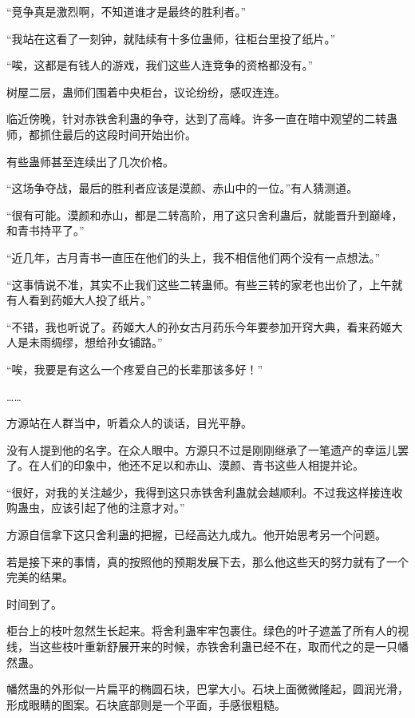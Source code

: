 
\begin{this_body}

“竞争真是激烈啊，不知道谁才是最终的胜利者。”

“我站在这看了一刻钟，就陆续有十多位蛊师，往柜台里投了纸片。”

“唉，这都是有钱人的游戏，我们这些人连竞争的资格都没有。”

树屋二层，蛊师们围着中央柜台，议论纷纷，感叹连连。

临近傍晚，针对赤铁舍利蛊的争夺，达到了高峰。许多一直在暗中观望的二转蛊师，都抓住最后的这段时间开始出价。

有些蛊师甚至连续出了几次价格。

“这场争夺战，最后的胜利者应该是漠颜、赤山中的一位。”有人猜测道。

“很有可能。漠颜和赤山，都是二转高阶，用了这只舍利蛊后，就能晋升到巅峰，和青书持平了。”

“近几年，古月青书一直压在他们的头上，我不相信他们两个没有一点想法。”

“这事情说不准，其实不止我们这些二转蛊师。有些三转的家老也出价了，上午就有人看到药姬大人投了纸片。”

“不错，我也听说了。药姬大人的孙女古月药乐今年要参加开窍大典，看来药姬大人是未雨绸缪，想给孙女铺路。”

“唉，我要是有这么一个疼爱自己的长辈那该多好！”

……

方源站在人群当中，听着众人的谈话，目光平静。

没有人提到他的名字。在众人眼中。方源只不过是刚刚继承了一笔遗产的幸运儿罢了。在人们的印象中，他还不足以和赤山、漠颜、青书这些人相提并论。

“很好，对我的关注越少，我得到这只赤铁舍利蛊就会越顺利。不过我这样接连收购蛊虫，应该引起了他的注意才对。”

方源自信拿下这只舍利蛊的把握，已经高达九成九。他开始思考另一个问题。

若是接下来的事情，真的按照他的预期发展下去，那么他这些天的努力就有了一个完美的结果。

时间到了。

柜台上的枝叶忽然生长起来。将舍利蛊牢牢包裹住。绿色的叶子遮盖了所有人的视线，当这些枝叶重新舒展开来的时候，赤铁舍利蛊已经不在，取而代之的是一只幡然蛊。

幡然蛊的外形似一片扁平的椭圆石块，巴掌大小。石块上面微微隆起，圆润光滑，形成眼睛的图案。石块底部则是一个平面，手感很粗糙。


\end{this_body}
